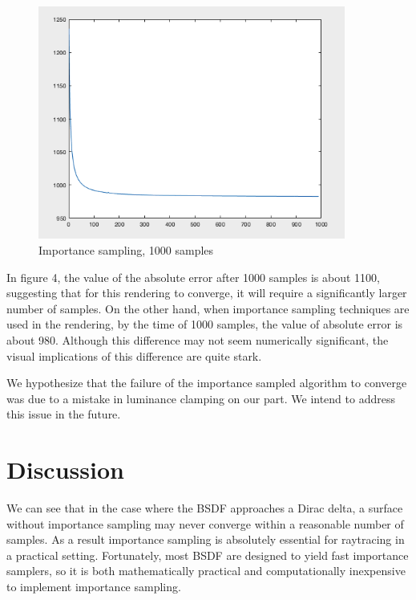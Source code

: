 \documentclass[12pt]{article}
\begin{document}
\begin{figure}[H]
  \centering
    \includegraphics[width=0.9\textwidth]{IS1000.png}
    \caption{Importance sampling, 1000 samples}
\end{figure}

In figure 4, the value of the absolute error after 1000 samples is about 1100, suggesting that for this rendering to converge, it will require a significantly larger number of samples. On the other hand, when importance sampling techniques are used in the rendering, by the time of 1000 samples, the value of absolute error is about 980. 
Although this difference may not seem numerically significant, the visual implications of this difference are quite stark.

We hypothesize that the failure of the importance sampled algorithm to converge was due to a mistake in luminance clamping on our part. 
We intend to address this issue in the future.

\section{Discussion}

We can see that in the case where the BSDF approaches a Dirac delta, a surface without importance sampling may never converge within a reasonable number of samples.
As a result importance sampling is absolutely essential for raytracing in a practical setting.
Fortunately, most BSDF are designed to yield fast importance samplers, so it is both mathematically practical and computationally inexpensive to implement importance sampling. 

\nocite{jiayin_2017}
\nocite{koenderink1996bidirectional}

\printbibliography
\end{document}
